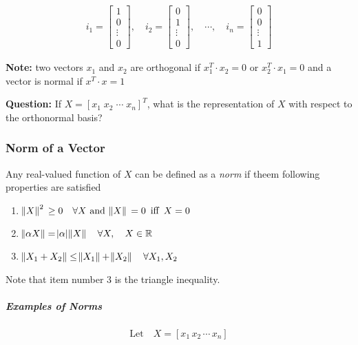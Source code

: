 \begin{align}
i_1 =
\begin{bmatrix}
  1 \\ 0 \\ \vdots \\ 0
\end{bmatrix},
\quad
i_2 =
\begin{bmatrix}
  0 \\ 1 \\ \vdots \\ 0
\end{bmatrix},
\quad \cdots, \quad
i_n =
\begin{bmatrix}
  0 \\ 0 \\ \vdots \\ 1
\end{bmatrix}
\end{align}

\noindent \textbf{Note:} two vectors $x_1$ and $x_2$ are orthogonal if $x_1^T \cdot x_2 = 0$
or $x_2^T \cdot x_1 = 0$ and a vector is normal if $x^T \cdot x = 1$

\noindent \textbf{Question:} If $X = [x_1 \; x_2 \; \cdots \; x_n]^T$, what is
the representation of $X$ with respect to the orthonormal basis?

\subsubsection{Norm of a Vector}
Any real-valued function of $X$ can be defined as a \textit{norm} if theem
following properties are satisfied

\begin{enumerate}
  \item $\norm{X}^2 \, \geq 0 \quad \forall X \text{ and } \norm{X} \, = 0 \, \text{ iff } \, X = 0$
  \item $\norm{\alpha X} = \abs{\alpha} \norm{X} \quad \forall X , \quad X \in \mathbb{R}$
  \item $\norm{X_1 + X_2} \leq \norm{X_1} + \norm{X_2} \quad \forall X_1, X_2$
\end{enumerate}

\noindent Note that item number 3 is the triangle inequality.

\subparagraph{Examples of Norms}

\begin{equation}
  \text{Let} \quad X = [x_1 \, x_2 \, \cdots \, x_n]
\end{equation}

